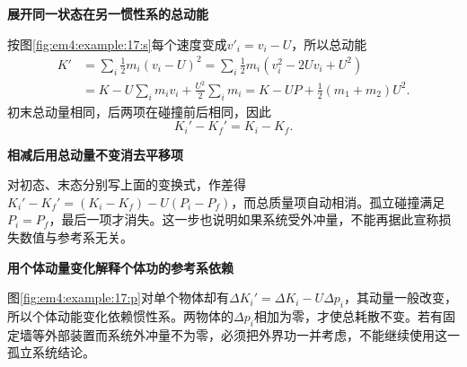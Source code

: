 \begin{solution}\textbf{展开同一状态在另一惯性系的总动能}\par\nobreak
按图\ref{fig:em4:example:17:s}每个速度变成$v'_i=v_i-U$，所以总动能
\begin{align*}
K'&=\sum_i\frac12m_i(v_i-U)^2
=\sum_i\frac12m_i(v_i^2-2Uv_i+U^2)\\
&=K-U\sum_i m_iv_i+\frac{U^2}{2}\sum_i m_i
=K-UP+\frac12(m_1+m_2)U^2.
\end{align*}
初末总动量相同，后两项在碰撞前后相同，因此
\[\boxed{K_i'-K_f'=K_i-K_f}.\]




\par\medskip{}\noindent\textbf{相减后用总动量不变消去平移项}\par\nobreak
对初态、末态分别写上面的变换式，作差得$K_i'-K_f'=(K_i-K_f)-U(P_i-P_f)$，而总质量项自动相消。孤立碰撞满足$P_i=P_f$，最后一项才消失。这一步也说明如果系统受外冲量，不能再据此宣称损失数值与参考系无关。



\par\medskip{}\noindent\textbf{用个体动量变化解释个体功的参考系依赖}\par\nobreak
图\ref{fig:em4:example:17:p}对单个物体却有$\Delta K_i'=\Delta K_i-U\Delta p_i$，其动量一般改变，所以个体动能变化依赖惯性系。两物体的$\Delta p_i$相加为零，才使总耗散不变。若有固定墙等外部装置而系统外冲量不为零，必须把外界功一并考虑，不能继续使用这一孤立系统结论。\end{solution}
